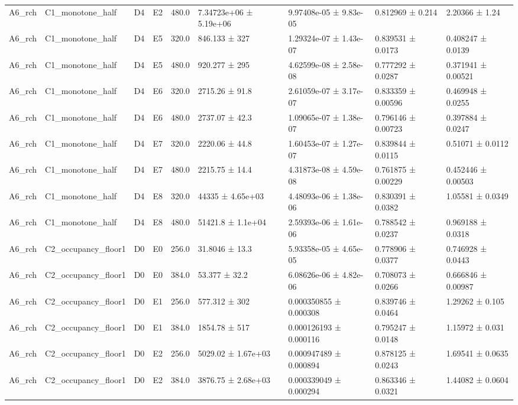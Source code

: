 \begin{table}
\begin{tabular}{lllllllll}
A6\_rch & C1\_monotone\_half & D4 & E2 & 480.0 & 7.34723e+06 ± 5.19e+06 & 9.97408e-05 ± 9.83e-05 & 0.812969 ± 0.214 & 2.20366 ± 1.24 \\
A6\_rch & C1\_monotone\_half & D4 & E5 & 320.0 & 846.133 ± 327 & 1.29324e-07 ± 1.43e-07 & 0.839531 ± 0.0173 & 0.408247 ± 0.0139 \\
A6\_rch & C1\_monotone\_half & D4 & E5 & 480.0 & 920.277 ± 295 & 4.62599e-08 ± 2.58e-08 & 0.777292 ± 0.0287 & 0.371941 ± 0.00521 \\
A6\_rch & C1\_monotone\_half & D4 & E6 & 320.0 & 2715.26 ± 91.8 & 2.61059e-07 ± 3.17e-07 & 0.833359 ± 0.00596 & 0.469948 ± 0.0255 \\
A6\_rch & C1\_monotone\_half & D4 & E6 & 480.0 & 2737.07 ± 42.3 & 1.09065e-07 ± 1.38e-07 & 0.796146 ± 0.00723 & 0.397884 ± 0.0247 \\
A6\_rch & C1\_monotone\_half & D4 & E7 & 320.0 & 2220.06 ± 44.8 & 1.60453e-07 ± 1.27e-07 & 0.839844 ± 0.0115 & 0.51071 ± 0.0112 \\
A6\_rch & C1\_monotone\_half & D4 & E7 & 480.0 & 2215.75 ± 14.4 & 4.31873e-08 ± 4.59e-08 & 0.761875 ± 0.00229 & 0.452446 ± 0.00503 \\
A6\_rch & C1\_monotone\_half & D4 & E8 & 320.0 & 44335 ± 4.65e+03 & 4.48093e-06 ± 1.38e-06 & 0.830391 ± 0.0382 & 1.05581 ± 0.0349 \\
A6\_rch & C1\_monotone\_half & D4 & E8 & 480.0 & 51421.8 ± 1.1e+04 & 2.59393e-06 ± 1.61e-06 & 0.788542 ± 0.0237 & 0.969188 ± 0.0318 \\
A6\_rch & C2\_occupancy\_floor1 & D0 & E0 & 256.0 & 31.8046 ± 13.3 & 5.93358e-05 ± 4.65e-05 & 0.778906 ± 0.0377 & 0.746928 ± 0.0443 \\
A6\_rch & C2\_occupancy\_floor1 & D0 & E0 & 384.0 & 53.377 ± 32.2 & 6.08626e-06 ± 4.82e-06 & 0.708073 ± 0.0266 & 0.666846 ± 0.00987 \\
A6\_rch & C2\_occupancy\_floor1 & D0 & E1 & 256.0 & 577.312 ± 302 & 0.000350855 ± 0.000308 & 0.839746 ± 0.0464 & 1.29262 ± 0.105 \\
A6\_rch & C2\_occupancy\_floor1 & D0 & E1 & 384.0 & 1854.78 ± 517 & 0.000126193 ± 0.000116 & 0.795247 ± 0.0148 & 1.15972 ± 0.031 \\
A6\_rch & C2\_occupancy\_floor1 & D0 & E2 & 256.0 & 5029.02 ± 1.67e+03 & 0.000947489 ± 0.000894 & 0.878125 ± 0.0243 & 1.69541 ± 0.0635 \\
A6\_rch & C2\_occupancy\_floor1 & D0 & E2 & 384.0 & 3876.75 ± 2.68e+03 & 0.000339049 ± 0.000294 & 0.863346 ± 0.0321 & 1.44082 ± 0.0604 \\

\end{tabular}
\end{table}
